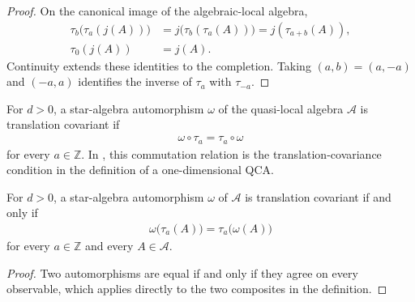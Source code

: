 \begin{proof}\leanok
    On the canonical image of the algebraic-local algebra,
    \begin{align}
        \tau_b\bigl(\tau_a(j(A))\bigr)
                     & =j\bigl(\tau_b(\tau_a(A))\bigr)
        =j(\tau_{a+b}(A)),                             \\
        \tau_0(j(A)) & =j(A).
    \end{align}
    Continuity extends these identities to the completion.  Taking
    $(a,b)=(a,-a)$ and $(-a,a)$ identifies the inverse of $\tau_a$ with
    $\tau_{-a}$.
\end{proof}

\begin{definition}
    \label{def:qca_translation_covariant}
    \leanok
    For $d>0$, a star-algebra automorphism $\omega$ of the quasi-local algebra
    $\mathcal A$ is translation covariant if
    \begin{align}
        \omega\circ\tau_a=\tau_a\circ\omega
    \end{align}
    for every $a\in\mathbb Z$.  In \cite[line~2298]{Cirac2017MPU}, this commutation relation is the translation-covariance condition in the
    definition of a one-dimensional QCA.
\end{definition}

\begin{lemma}
    \label{thm:qca_translation_covariant_iff}
    \leanok
    For $d>0$, a star-algebra automorphism $\omega$ of $\mathcal A$ is
    translation covariant if and only if
    \begin{align}
        \omega\bigl(\tau_a(A)\bigr)=\tau_a\bigl(\omega(A)\bigr)
    \end{align}
    for every $a\in\mathbb Z$ and every $A\in\mathcal A$.
\end{lemma}

\begin{proof}\leanok
    Two automorphisms are equal if and only if they agree on every observable,
    which applies directly to the two composites in the definition.
\end{proof}

